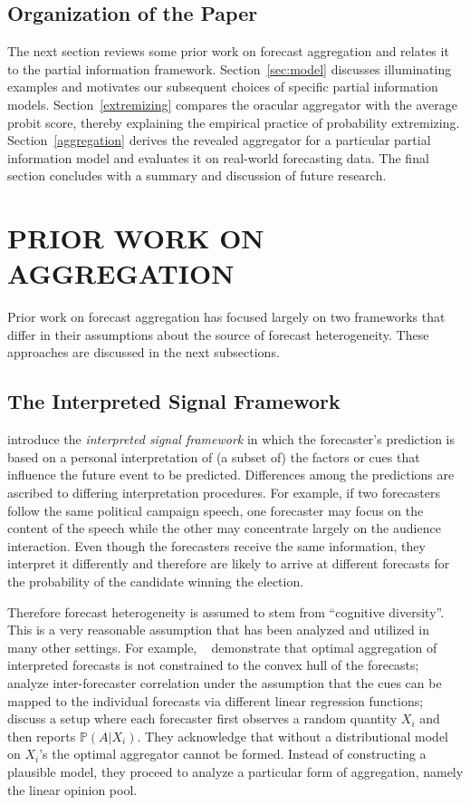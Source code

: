 \documentclass[12pt]{article}
\renewcommand{\P}{\mathbb{P}}
\theoremstyle{definition}
\theoremstyle{definition}
\def\P{{\mathbb P}}
\begin{document}
\subsection{Organization of the Paper}

The next section reviews some prior work on forecast aggregation and relates it to the partial information framework.
Section~\ref{sec:model} discusses illuminating examples and
motivates our subsequent choices of specific partial information
models.  Section~\ref{extremizing} compares the oracular aggregator with the average probit score, thereby explaining the
empirical practice of probability extremizing.
Section~\ref{aggregation} derives the revealed aggregator for a
particular partial information model and evaluates it on real-world
forecasting data.  The final section concludes with a summary and discussion of
future research.


\section{PRIOR WORK ON AGGREGATION}
\label{sec:prior}
Prior work on forecast aggregation has focused largely on two frameworks that differ in their assumptions about the source of forecast heterogeneity.  These approaches are discussed in the next subsections.

\subsection{The Interpreted Signal Framework}
\label{ss:inerpreted}

\citet{hong2009interpreted} introduce the {\em interpreted signal
framework} in which the forecaster's prediction is based on a personal
interpretation of (a subset of) the factors or cues that influence the
future event to be predicted.  Differences among the 
predictions are ascribed to differing interpretation procedures.  For
example, if two forecasters follow the same political campaign speech,
one forecaster may focus on the content of the speech while the other may
concentrate largely on the audience interaction.  Even though the
forecasters receive the same information, they interpret it
differently and therefore are likely to arrive at different forecasts for the probability of the candidate winning the election.

Therefore forecast heterogeneity is assumed to stem from ``cognitive
diversity''.  This is a very reasonable assumption that has been analyzed and
utilized in many other settings.  For example,
~\citet{parunak2013characterizing} demonstrate that optimal
aggregation of interpreted forecasts is not constrained to the
convex hull of the forecasts; \citet{broomell2009experts} analyze
inter-forecaster correlation under the assumption that the cues can be
mapped to the individual forecasts via different linear regression
functions; \citet{degroot1991optimal} discuss a setup where each forecaster first observes a random quantity $X_i$ and then reports $\P(A | X_i)$. They  acknowledge that without a distributional model on $X_i$'s the optimal aggregator cannot be formed. Instead of constructing a plausible model, they proceed to analyze a particular form of aggregation, namely the linear opinion pool. 
\end{document}
